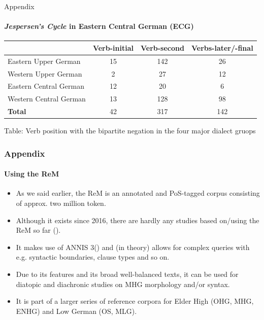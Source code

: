 \documentclass[xcolor=table, compress, %
handout
]{beamer}
\begin{document}
\begin{frame}{Appendix}
\framesubtitle{\textit{Jespersen's Cycle} in Eastern Central German (ECG)}

\begin{footnotesize}
\begin{center}
\begin{tabular}{l c c c}
\toprule
 & \textbf{Verb-initial} & \textbf{Verb-second} & \textbf{Verbs-later/-final}\\
\hline
Eastern Upper German & 15 & 142 & 26\\
Western Upper German & 2 & 27 & 12\\
\alert{Eastern Central German} & \alert{12} & \alert{20} & \alert{6}\\
Western Central German & 13 & 128 & 98\\ 
\hline
\textbf{Total} & 42 & 317 & 142\\
\bottomrule
\end{tabular}
\end{center}
\end{footnotesize}

\begin{center}
Table: Verb position with the bipartite negation in the four major dialect gruops
\end{center}

\end{frame}

\begin{frame}
\frametitle{Appendix}
\framesubtitle{Using the ReM}
    
\begin{itemize}
    \item As we said earlier, the ReM is an annotated and PoS-tagged corpus consisting of approx. two million token.
    \item Although it exists since 2016, there are hardly any studies based on/using the ReM so far (\citealt{witzenhausen19, Schwarz2019, pickl21}).
    \item It makes use of ANNIS 3(\citealt{Krause2016}) and (in theory) allows for complex queries with e.g. syntactic boundaries, clause types and so on.
    \item Due to its features and its broad well-balanced texts, it can be used for diatopic and diachronic studies on MHG morphology and/or syntax.
    \item It is part of a larger series of reference corpora for Elder High (OHG, MHG, ENHG) and Low German (OS, MLG).
\end{itemize}
    
\end{frame}
\end{document}

